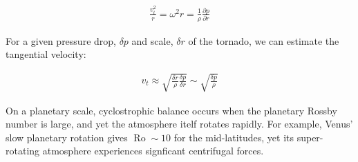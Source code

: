\documentclass[11pt]{article}
\begin{document}
\begin{align}
    \frac{v_t^2}{r} = \omega^2 r = \frac{1}{\rho}\frac{\partial p}{\partial r}
\end{align}

For a given pressure drop, \(\delta p\) and scale, \(\delta r\) of the
tornado, we can estimate the tangential velocity:

\begin{align}
    v_t \approx \sqrt{ \frac{\delta r}{\rho}\frac{\delta p}{\delta r} } \sim \sqrt{\frac{\delta p}{\rho}}
\end{align}

On a planetary scale, cyclostrophic balance occurs when the planetary
Rossby number is large, and yet the atmosphere itelf rotates rapidly.
For example, Venus' slow planetary rotation gives
\(\operatorname{Ro} \sim 10\) for the mid-latitudes, yet its
super-rotating atmosphere experiences signficant centrifugal forces.


    
    
    
    
\end{document}
